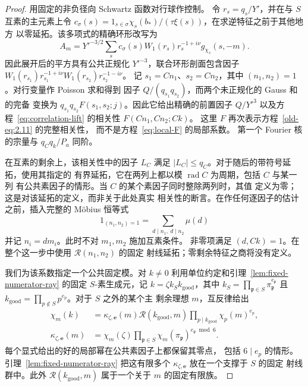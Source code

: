 \documentclass[11pt,a4paper]{article}
\numberwithin{equation}{section}
\numberwithin{figure}{section}
\theoremstyle{definition}
\theoremstyle{remark}
\begin{document}
\begin{proof}
用固定的非负径向 Schwartz 函数对行球作控制。
令 $r_s=q_s/Y'$，并在与 $S$ 互素的主元素上令
$c_\sigma(s)=1_{s\in\sigma}\chi_s(b_*)/(\tau\xi(s))$，在求逆特征之前于其他地方
以零延拓。该多项式的精确环形改写为
\[
 A_m=Y'^{-3/2}\sum_s c_\sigma(s)W_1(r_s)r_s^{-1+i\nu}
                          g_{\chi_s}(s,-m).
\]
因此展开后的平方具有公共正规化 $Y'^{-3}$，联合环形剖面包含因子
$W_1(r_{s_1})r_{s_1}^{-1+i\nu}W_1(r_{s_2})r_{s_2}^{-1-i\nu}$。
记 $s_1=Cn_1$、$s_2=Cn_2$，其中 $(n_1,n_2)=1$。对行变量作 Poisson 求和得到
因子 $Q/(q_{s_1}q_{s_2})$，而两个未正规化的 Gauss 和的完备
变换为 $q_{s_1}q_{s_2}F(s_1,s_2;j)$。因此它给出精确的前置因子
$Q/Y'^3$ 以及方程~\eqref{eq:correlation-lift} 的相关性
$F(Cn_1,Cn_2;Ck)$。
这里 $F$ 再次表示方程~\eqref{old-eq:2.11} 的完整相关性，
而不是方程~\eqref{eq:local-F} 的局部系数。
第一个 Fourier 核的宗量与 $q_Cq_k/P_a$ 同阶。

在互素的剩余上，该相关性中的因子 $L_C$ 满足
$|L_C|\le q_C$。对于随后的带符号延拓，使用其指定的
有界延拓，它在两列上都以模 $\operatorname{rad}C$ 为周期，包括 $C$ 与某一列
有公共素因子的情形。当 $C$ 的某个素因子同时整除两列时，其值
定义为零；这是对该延拓的定义，而非关于此处真实
相关性的断言。在作任何逐因子的估计之前，插入完整的
M\"obius 恒等式
\[
 1_{(n_1,n_2)=1}=\sum_{d\mid n_1,\ d\mid n_2}\mu(d)
\]
并记 $n_i=dm_i$。此时不对 $m_1,m_2$ 施加互素条件。
非零项满足 $(d,Ck)=1$。在整个这一步中使用 $\mathcal R(n_1,n_2)$ 的固定
射线延拓；零剩余特征之商将没有定义。

我们为该系数指定一个公共固定模。对 $k\ne0$
利用单位约定和引理~\ref{lem:fixed-numerator-ray} 的固定 $S$-素生成元，记
$k=\zeta k_Sk_{\mathrm{good}}$，其中
$k_S=\prod_{\mathfrak p\in S}\pi_{\mathfrak p}^{e_{\mathfrak p}}$
且 $k_{\mathrm{good}}=\prod_{p\notin S}p^{e_p}$。对于 $S$ 之外的某个主
剩余理想 $m$，互反律给出
\[
 \begin{split}
 \chi_m(k)&=\kappa_{\zeta,\boldsymbol e}(m)
       \mathcal R(k_{\mathrm{good}},m)
       \prod_{p\mid k_{\mathrm{good}}}\chi_p(m)^{e_p},\\
 \kappa_{\zeta,\boldsymbol e}(m)
       &=\chi_m(\zeta)\prod_{\mathfrak p\in S}
             \chi_m(\pi_{\mathfrak p})^{e_{\mathfrak p}\bmod6}.
 \end{split}
\]
每个显式给出的好的局部幂在公共素因子上都保留其零点，
包括 $6\mid e_p$ 的情形。引理~\ref{lem:fixed-numerator-ray}
把这有限多个 $\kappa_{\zeta,\boldsymbol e}$ 放在一个支撑于 $S$ 的固定
射线群中。此外 $\mathcal R(k_{\mathrm{good}},m)$
属于一个关于 $m$ 的固定有限族。


\end{proof}
\end{document}
